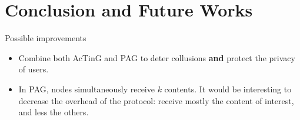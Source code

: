 \documentclass[10pt]{beamer}
\begin{document}
\section{Conclusion and Future Works}


\begin{frame}{Possible improvements}{}
\begin{itemize}
   \item Combine both AcTinG and PAG to deter collusions \textbf{and} protect the privacy of users.
   \item In PAG, nodes simultaneously receive $k$ contents. It would be interesting to decrease the overhead of the protocol: receive mostly the content of interest, and less the others.
\end{itemize}
\end{frame}


{\2
\begin{frame}
\end{frame}}
\end{document}
